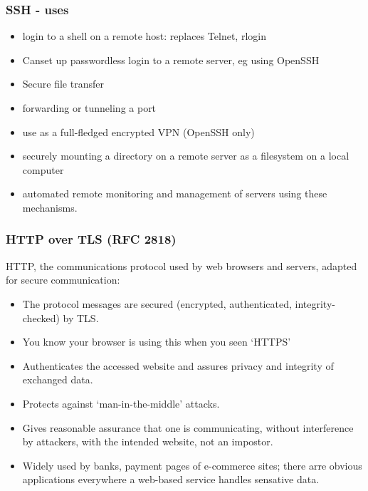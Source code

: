 \documentclass[10pt, hyperref={pdfpagelabels=false}]{beamer}
\begin{document}
\begin{frame}
\frametitle{SSH - uses}
\begin{itemize}
\item login to a shell on a remote host: replaces Telnet, rlogin
\item Canset up passwordless login to a remote server, eg using OpenSSH
\item Secure file transfer
\item forwarding or tunneling a port
\item use as a full-fledged encrypted VPN (OpenSSH only)
\item securely mounting a directory on a remote server as a filesystem on a local computer
\item automated remote monitoring and management of servers using these mechanisms.
\end{itemize}
\end{frame}

\begin{frame}
\frametitle{HTTP over TLS (RFC 2818)}
HTTP, the communications protocol used by web browsers and servers, adapted for secure communication:
\begin{itemize}
\item The protocol messages are secured (encrypted, authenticated, integrity-checked) by TLS.
\item You know your browser is using this when you seen `HTTPS'
\item Authenticates the accessed website and assures privacy and integrity of exchanged data.
\item Protects against `man-in-the-middle' attacks.
\item Gives reasonable assurance that one is communicating, without interference by attackers, with the intended website, not an impostor. 
\item Widely used by banks, payment pages of e-commerce sites; there arre obvious applications everywhere a web-based service handles sensative data.
\end{itemize}
\end{frame}
\end{document}
